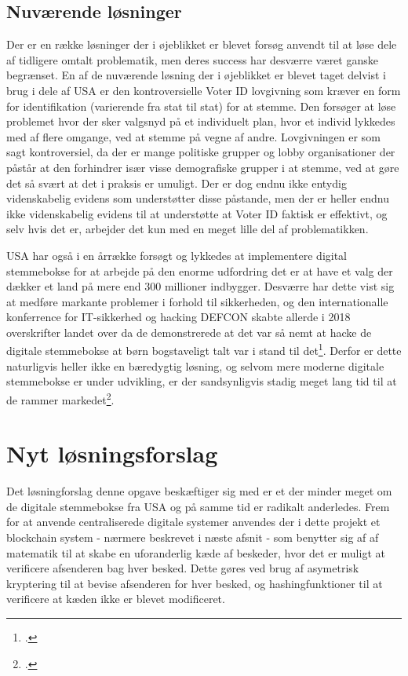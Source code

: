 \documentclass[a4paper, 8pt, oneside]{article} %
\begin{document}
\subsection{Nuværende løsninger}
Der er en række løsninger der i øjeblikket er blevet forsøg anvendt til at løse dele af tidligere omtalt problematik, men deres success har desværre været ganske begrænset. En af de nuværende løsning der i øjeblikket er blevet taget delvist i brug i dele af USA er den kontroversielle Voter ID lovgivning som kræver en form for identifikation (varierende fra stat til stat) for at stemme. Den forsøger at løse problemet hvor der sker valgsnyd på et individuelt plan, hvor et individ lykkedes med af flere omgange, ved at stemme på vegne af andre. Lovgivningen er som sagt kontroversiel, da der er mange politiske grupper og lobby organisationer der påstår at den forhindrer især visse demografiske grupper i at stemme, ved at gøre det så svært at det i praksis er umuligt. Der er dog endnu ikke entydig videnskabelig evidens som understøtter disse påstande, men der er heller endnu ikke videnskabelig evidens til at understøtte at Voter ID faktisk er effektivt, og selv hvis det er, arbejder det kun med en meget lille del af problematikken.

USA har også i en årrække forsøgt og lykkedes at implementere digital stemmebokse for at arbejde på den enorme udfordring det er at have et valg der dækker et land på mere end 300 millioner indbygger. Desværre har dette vist sig at medføre markante problemer i forhold til sikkerheden, og den internationalle konferrence for IT-sikkerhed og hacking DEFCON skabte allerde i 2018 overskrifter landet over da de demonstrerede at det var så nemt at hacke de digitale stemmebokse at børn bogstaveligt talt var i stand til det\footcite{hern_kids_2018}. Derfor er dette naturligvis heller ikke en bæredygtig løsning, og selvom mere moderne digitale stemmebokse er under udvikling, er der sandsynligvis stadig meget lang tid til at de rammer markedet\footcite{ng_darpas_nodate}.

\section{Nyt løsningsforslag}
Det løsningforslag denne opgave beskæftiger sig med er et der minder meget om de digitale stemmebokse fra USA og på samme tid er radikalt anderledes. Frem for at anvende centraliserede digitale systemer anvendes der i dette projekt et blockchain system - nærmere beskrevet i næste afsnit - som benytter sig af af matematik til at skabe en uforanderlig kæde af beskeder, hvor det er muligt at verificere afsenderen bag hver besked. Dette gøres ved brug af asymetrisk kryptering til at bevise afsenderen for hver besked, og hashingfunktioner til at verificere at kæden ikke er blevet modificeret.
\end{document}

